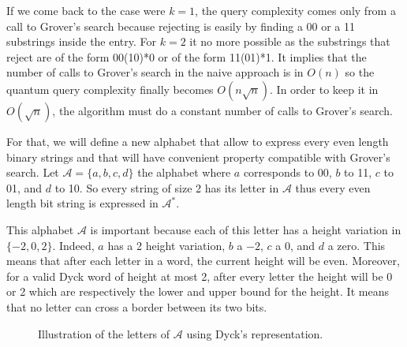 \documentclass[11pt,a4paper]{article}
\theoremstyle{definition}
\theoremstyle{plain}
\theoremstyle{definition}
\begin{document}
If we come back to the case were $k=1$, the query complexity comes only from a call to Grover's search
because rejecting is easily by finding a 00 or a 11 substrings inside the entry. For $k=2$
it no more possible as the substrings that reject are of the form 00(10)*0 or of the form 11(01)*1. It
implies that the number of calls to Grover's search in the naive approach is in $O\left(n\right)$ so the
quantum query complexity finally becomes $O\left(n\sqrt{n}\right)$. In order to keep it in
$O\left(\sqrt{n}\right)$, the algorithm must do a constant number of calls to Grover's search.

For that, we will  define a new alphabet that allow to express every even length binary
strings and that will have convenient property compatible with Grover's search. Let
$\mathcal{A} = \{a, b, c, d\}$ the alphabet where $a$ corresponds to 00, $b$ to 11, $c$
to 01, and $d$ to 10. So every string of size 2 has its letter in $\mathcal{A}$ thus every
even length bit string is expressed in $\mathcal{A}^*$.

This alphabet $\mathcal{A}$ is important because each of this letter has a height variation
in $\{-2, 0, 2\}$. Indeed, $a$ has a 2 height variation, $b$ a $-2$, $c$ a 0, and $d$ a zero.
This means that after each letter in a word, the current height will be even. Moreover,
for a valid Dyck word of height at most 2, after every letter the height will be 0 or 2
which are respectively the lower and upper bound for the height. It means that no letter
can cross a border between its two bits.

\begin{figure}[htb]
    \centering
    \caption{Illustration of the letters of $\mathcal{A}$ using Dyck's representation.}
    \label{tikz:dyck2alphabet}
\end{figure}
\end{document}
